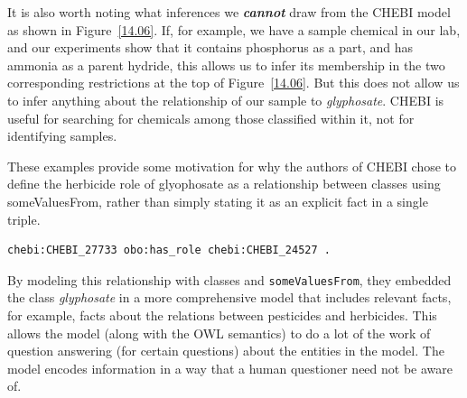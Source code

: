 It is also worth noting what inferences we \textbf{\textit{cannot}} draw from the CHEBI
model as shown in Figure~\ref{14.06}. If, for example, we have a sample
chemical in our lab, and our experiments show that it contains
phosphorus as a part, and has ammonia as a parent hydride, this allows
us to infer its membership in the two corresponding restrictions at the
top of Figure~\ref{14.06}. But this does not allow us to infer anything about
the relationship of our sample to \textit{glyphosate}. CHEBI is useful for
searching for chemicals among those classified within it, not for
identifying samples.

These examples provide some motivation for why the authors of CHEBI
chose to define the
herbicide role of glyophosate as a relationship between classes using
someValuesFrom, rather than simply stating it as an explicit fact in a
single triple.

\begin{lstlisting}
chebi:CHEBI_27733 obo:has_role chebi:CHEBI_24527 .
\end{lstlisting}

By modeling this relationship with classes and \texttt{someValuesFrom}, they
embedded the class \textit{glyphosate} in a more comprehensive model that
includes relevant facts, for example, facts about the relations between
pesticides and herbicides. This allows the model (along with the OWL
semantics) to do a lot of the work of question answering (for certain
questions) about the entities in the model. The model encodes
information in a way that a human questioner need not be aware of.

